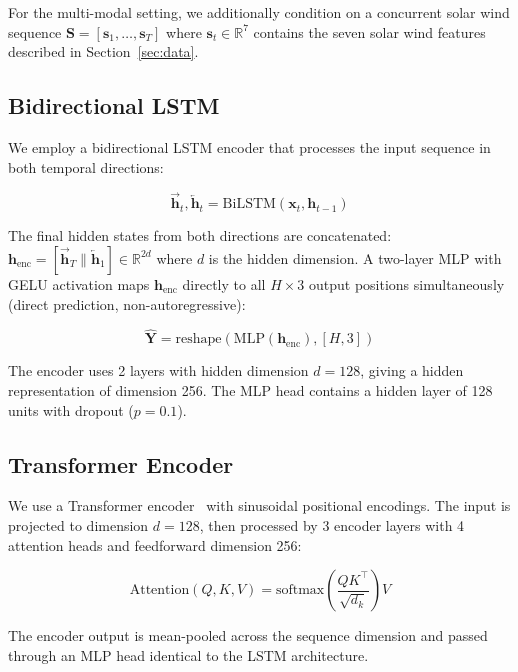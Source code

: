 \documentclass[twocolumn]{article}
\begin{document}
For the multi-modal setting, we additionally condition on a concurrent
solar wind sequence $\mathbf{S} = [\mathbf{s}_1, \ldots, \mathbf{s}_T]$
where $\mathbf{s}_t \in \mathbb{R}^7$ contains the seven solar wind
features described in Section~\ref{sec:data}.

\subsection{Bidirectional LSTM}

We employ a bidirectional LSTM encoder that processes the input sequence
in both temporal directions:

\begin{equation}
  \overrightarrow{\mathbf{h}}_t, \overleftarrow{\mathbf{h}}_t = \text{BiLSTM}(\mathbf{x}_t, \mathbf{h}_{t-1})
\end{equation}

The final hidden states from both directions are concatenated:
$\mathbf{h}_{\text{enc}} = [\overrightarrow{\mathbf{h}}_T \| \overleftarrow{\mathbf{h}}_1] \in \mathbb{R}^{2d}$
where $d$ is the hidden dimension. A two-layer MLP with GELU activation
maps $\mathbf{h}_{\text{enc}}$ directly to all $H \times 3$ output
positions simultaneously (direct prediction, non-autoregressive):

\begin{equation}
  \hat{\mathbf{Y}} = \text{reshape}(\text{MLP}(\mathbf{h}_{\text{enc}}), [H, 3])
\end{equation}

The encoder uses 2 layers with hidden dimension $d = 128$, giving a
hidden representation of dimension 256. The MLP head contains a hidden
layer of 128 units with dropout ($p = 0.1$).

\subsection{Transformer Encoder}

We use a Transformer encoder~\citep{vaswani2017attention} with sinusoidal
positional encodings. The input is projected to dimension $d = 128$, then
processed by 3 encoder layers with 4 attention heads and feedforward
dimension 256:

\begin{equation}
  \text{Attention}(Q, K, V) = \text{softmax}\left(\frac{QK^\top}{\sqrt{d_k}}\right) V
\end{equation}

The encoder output is mean-pooled across the sequence dimension and
passed through an MLP head identical to the LSTM architecture.
\end{document}
